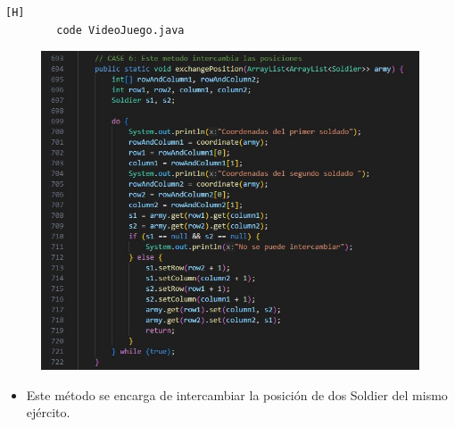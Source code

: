 \documentclass{article}
\begin{document}
	
	
	\begin{lstlisting}[language=bash,caption={Se implementa el método para intercambiar posiciones entre soldados }][H]
		code VideoJuego.java
	\end{lstlisting}
	
	\begin{figure}[H]
		\centering
		\includegraphics[width=1\textwidth,keepaspectratio]{img/exchangeSoldier.jpg}
	\end{figure}
	
	\begin{itemize}	
		\item Este método se encarga de intercambiar la posición de dos Soldier del mismo ejército.
	\end{itemize}
	
\end{document}
